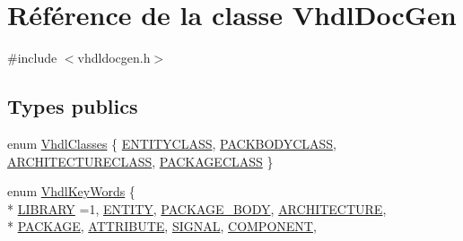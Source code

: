 \hypertarget{class_vhdl_doc_gen}{}\section{Référence de la classe Vhdl\+Doc\+Gen}
\label{class_vhdl_doc_gen}


{\ttfamily \#include $<$vhdldocgen.\+h$>$}

\subsection*{Types publics}
\begin{DoxyCompactItemize}
\item 
enum \hyperlink{class_vhdl_doc_gen_a010ab08982f29df8c0f3d3f0f642f0f0}{Vhdl\+Classes} \{ \hyperlink{class_vhdl_doc_gen_a010ab08982f29df8c0f3d3f0f642f0f0a0f87010297b89ed715ad63fccec9b90e}{E\+N\+T\+I\+T\+Y\+C\+L\+A\+S\+S}, 
\hyperlink{class_vhdl_doc_gen_a010ab08982f29df8c0f3d3f0f642f0f0a4cdc00f213301fb089eb3906a07efd20}{P\+A\+C\+K\+B\+O\+D\+Y\+C\+L\+A\+S\+S}, 
\hyperlink{class_vhdl_doc_gen_a010ab08982f29df8c0f3d3f0f642f0f0ae0c7e4401e472ec3153e9793e240a431}{A\+R\+C\+H\+I\+T\+E\+C\+T\+U\+R\+E\+C\+L\+A\+S\+S}, 
\hyperlink{class_vhdl_doc_gen_a010ab08982f29df8c0f3d3f0f642f0f0ae69513dd677b13d97b6a2e3ae445d1ef}{P\+A\+C\+K\+A\+G\+E\+C\+L\+A\+S\+S}
 \}
\item 
enum \hyperlink{class_vhdl_doc_gen_a3f46a86d0561edb71388774696f6cea6}{Vhdl\+Key\+Words} \{ \\*
\hyperlink{class_vhdl_doc_gen_a3f46a86d0561edb71388774696f6cea6ace1559d6b194d1712298e2d0040d7107}{L\+I\+B\+R\+A\+R\+Y} =1, 
\hyperlink{class_vhdl_doc_gen_a3f46a86d0561edb71388774696f6cea6a604511e3915904fbe25310051952f859}{E\+N\+T\+I\+T\+Y}, 
\hyperlink{class_vhdl_doc_gen_a3f46a86d0561edb71388774696f6cea6ae421d9c7eca60207baf35f4cbd0b1da2}{P\+A\+C\+K\+A\+G\+E\+\_\+\+B\+O\+D\+Y}, 
\hyperlink{class_vhdl_doc_gen_a3f46a86d0561edb71388774696f6cea6a523358537aff4699052d808da11a58ab}{A\+R\+C\+H\+I\+T\+E\+C\+T\+U\+R\+E}, 
\\*
\hyperlink{class_vhdl_doc_gen_a3f46a86d0561edb71388774696f6cea6a28636405fd1d55082e41bae5b5b3c3a5}{P\+A\+C\+K\+A\+G\+E}, 
\hyperlink{class_vhdl_doc_gen_a3f46a86d0561edb71388774696f6cea6a74fd577ccb143927e3b8dbd90242ea82}{A\+T\+T\+R\+I\+B\+U\+T\+E}, 
\hyperlink{class_vhdl_doc_gen_a3f46a86d0561edb71388774696f6cea6a425d57cd5b88c50bf8d6a7f30f9aad5f}{S\+I\+G\+N\+A\+L}, 
\hyperlink{class_vhdl_doc_gen_a3f46a86d0561edb71388774696f6cea6a6e8760b776ac93d18d10f76f3e9b92a0}{C\+O\+M\+P\+O\+N\+E\+N\+T}, 

\end{DoxyCompactItemize}
